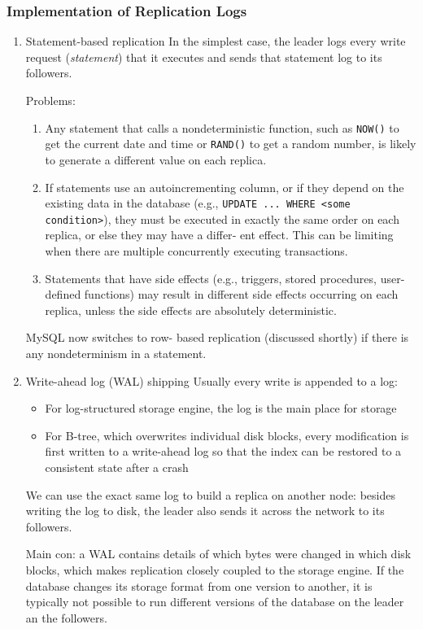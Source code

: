 \documentclass[11pt]{article}
\begin{document}
\subsubsection{Implementation of Replication Logs}
\label{sec:org2602c1b}
\begin{enumerate}
\item Statement-based replication
\label{sec:org2f44a5c}
In the simplest case, the leader logs every write request (\emph{statement}) that it executes and sends
that statement log to its followers.

Problems:
\begin{enumerate}
\item Any statement that calls a nondeterministic function, such as \texttt{NOW()} to get the current date
and time or \texttt{RAND()} to get a random number, is likely to generate a different value on each
replica.
\item If statements use an autoincrementing column, or if they depend on the existing data in the
database (e.g., \texttt{UPDATE ... WHERE <some condition>}), they must be executed in exactly the same
order on each replica, or else they may have a differ‐ ent effect. This can be limiting when
there are multiple concurrently executing transactions.
\item Statements that have side effects (e.g., triggers, stored procedures, user-defined functions)
may result in different side effects occurring on each replica, unless the side effects are
absolutely deterministic.
\end{enumerate}


MySQL now switches to row- based replication (discussed shortly) if there is any nondeterminism
in a statement.
\item Write-ahead log (WAL) shipping
\label{sec:org7209dba}
Usually every write is appended to a log:
\begin{itemize}
\item For log-structured storage engine, the log is the main place for storage
\item For B-tree, which overwrites individual disk blocks, every modification is first written to a
write-ahead log so that the index can be restored to a consistent state after a crash
\end{itemize}

We can use the exact same log to build a replica on another node: besides writing the log to
disk, the leader also sends it across the network to its followers.

Main con: a WAL contains details of which bytes were changed in which disk blocks, which
makes replication closely coupled to the storage engine. If the database changes its storage
format from one version to another, it is typically not possible to run different versions of
the database on the leader an the followers.


\end{enumerate}
\end{document}
